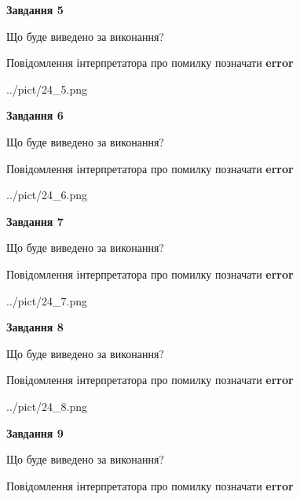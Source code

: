 \documentclass[11pt, ukrainian]{article}
\begin{document}
{\begin {large}
{\begin {center}\textbf{Завдання 5}\end {center}}\par
Що буде виведено за виконання? \par
Повідомлення інтерпретатора про помилку позначати \textbf{error}

\begin{center}
	{../pict/24_5.png}
\end{center}
\newpage

{\begin {center}\textbf{Завдання 6}\end {center}}\par
Що буде виведено за виконання? \par
Повідомлення інтерпретатора про помилку позначати \textbf{error}

\begin{center}
	{../pict/24_6.png}
\end{center}
\newpage

{\begin {center}\textbf{Завдання 7}\end {center}}\par
Що буде виведено за виконання? \par
Повідомлення інтерпретатора про помилку позначати \textbf{error}

\begin{center}
	{../pict/24_7.png}
\end{center}
\newpage

{\begin {center}\textbf{Завдання 8}\end {center}}\par
Що буде виведено за виконання? \par
Повідомлення інтерпретатора про помилку позначати \textbf{error}

\begin{center}
	{../pict/24_8.png}
\end{center}
\newpage

{\begin {center}\textbf{Завдання 9}\end {center}}\par
Що буде виведено за виконання? \par
Повідомлення інтерпретатора про помилку позначати \textbf{error}


\end{large}}
\end{document}
